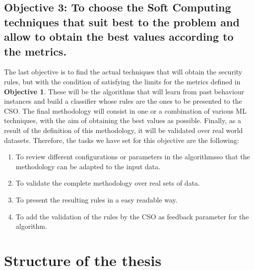 \newcommand{\objectivetechniques}{To choose the Soft Computing techniques that suit best to the problem and allow to obtain the best values according to the metrics.} 

\subsection*{Objective 3: \objectivetechniques}
\label{subsec:intro:obj:fwork} 

The last objective is to find the actual techniques that will obtain the security rules, but with the condition of satisfying the limits for the metrics defined in \textbf{Objective 1}. These will be the algorithms that will learn from past behaviour instances and build a classifier whose rules are the ones to be presented to the CSO. The final methodology will consist in one or a combination of various ML techniques, with the aim of obtaining the best values as possible. Finally, as a result of the definition of this methodology, it will be validated over real world datasets. Therefore, the tasks we have set for this objective are the following:

\begin{enumerate}
	\item To review different configurations or parameters in the algorithmsso that the methodology can be adapted to the input data.
	\item To validate the complete methodology over real sets of data. %
	\item To present the resulting rules in a easy readable way.
	\item To add the validation of the rules by the CSO as feedback parameter for the algorithm. %
\end{enumerate}



\section{Structure of the thesis}
\label{sec:intro:structure}

